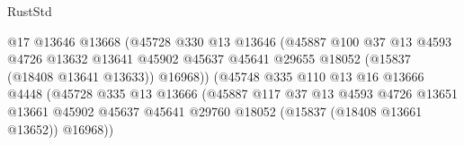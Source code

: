 \begin{lexlean}{RustStd}
\begin{coremodule}
{\begin{coremodule}
{{{{{{{{{{{{{{{{{{{{{{{{{{{{{{{{{{{{{{{{{{{{{{{{{{{{{{{{{{{{                                            @17
                                            @13646
                                            @13668
                                            (@45728
                                              @330
                                              @13
                                              @13646
                                              (@45887
                                                @100
                                                @37
                                                @13
                                                @4593
                                                @4726
                                                @13632
                                                @13641
                                                @45902
                                                @45637
                                                @45641
                                                @29655
                                                @18052
                                                (@15837 (@18408 @13641 @13633))
                                                @16968))
                                            (@45748
                                              @335
                                              @110
                                              @13
                                              @16
                                              @13666
                                              @4448
                                              (@45728
                                                @335
                                                @13
                                                @13666
                                                (@45887
                                                  @117
                                                  @37
                                                  @13
                                                  @4593
                                                  @4726
                                                  @13651
                                                  @13661
                                                  @45902
                                                  @45637
                                                  @45641
                                                  @29760
                                                  @18052
                                                  (@15837 (@18408 @13661 @13652))
                                                  @16968))
}}}}}}}}}}}}}}}}}}}}}}}}}}}}}}}}}}}}}}}}}}}}}}}}}}}}}}}}}}}}
\end{coremodule}}
\end{coremodule}
\end{lexlean}
